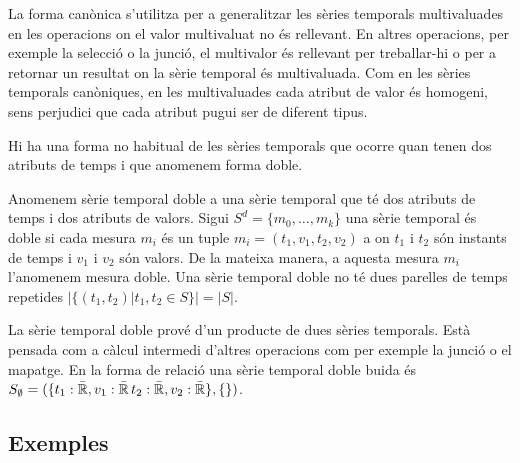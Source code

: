 La forma canònica s'utilitza per a
generalitzar les sèries temporals multivaluades en les operacions on
el valor multivaluat no és rellevant. En altres operacions, per
exemple la selecció o la junció, el multivalor és rellevant per
treballar-hi o per a retornar un resultat on la sèrie temporal és
multivaluada. Com en les sèries temporals canòniques, en les
multivaluades cada atribut de valor és homogeni, sens perjudici que
cada atribut pugui ser de diferent tipus.

  



Hi ha una forma no habitual de les sèries temporals que ocorre quan
tenen dos atributs de temps i que anomenem forma doble.

\begin{definition}
  \label{def:sgst:st-doble}
  Anomenem sèrie temporal doble a una sèrie temporal que té dos
  atributs de temps i dos atributs de valors. Sigui $S^d =\{m_0,
  \dotsc, m_k\}$ una sèrie temporal és doble si cada mesura $m_i$ és
  un tuple $m_i=(t_1,v_1,t_2,v_2)$ a on $t_1$ i $t_2$ són instants de
  temps i $v_1$ i $v_2$ són valors. De la mateixa manera, a aquesta
  mesura $m_i$ l'anomenem mesura doble.  Una sèrie temporal doble no
  té dues parelles de temps repetides $|\{(t_1,t_2) | t_1,t_2\in S\}|
  = |S|$.
\end{definition}

La sèrie temporal doble prové d'un producte de dues sèries
temporals. Està pensada com a càlcul intermedi d'altres operacions com
per exemple la junció o el mapatge. En la forma de relació una sèrie
temporal doble buida és $S_{\emptyset} = ( \{t_1: \bar{\mathbb{R}{}}, v_1:
\bar{\mathbb{R}{}}\, t_2: \bar{\mathbb{R}{}}, v_2: \bar{\mathbb{R}{}}\}, \{ \} )$.









\subsection{Exemples}


